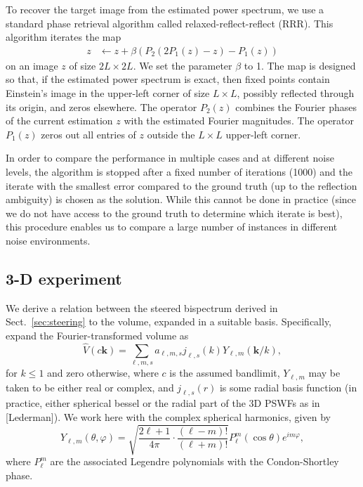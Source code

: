 \documentclass[english,11pt]{article}
\newcommand{\1}{\mathbf{1}}
\newcommand{\kk}{\textbf{k}}
\newcommand{\TODO}[1]{{\color{red}{[#1]}}}
\numberwithin{equation}{section}
\theoremstyle{plain}
\theoremstyle{definition}
\theoremstyle{remark}
\theoremstyle{plain}
\theoremstyle{remark}
\theoremstyle{plain}
\theoremstyle{plain}
\begin{document}
To recover the target image from the estimated power spectrum, we use a standard phase retrieval algorithm called relaxed-reflect-reflect (RRR). This algorithm iterates the map
\begin{align*}
	z & \leftarrow z + \beta (P_2(2P_1(z) - z) - P_1(z))
\end{align*}
on an image $z$ of size $2L\times 2L$.
We set the parameter $\beta$ to 1.
The map is designed so that, if the estimated power spectrum is exact, then fixed points contain Einstein's image in the upper-left corner of size $L \times L$, possibly reflected through its origin, and zeros elsewhere. The operator $P_2(z)$ combines the Fourier phases of  the current estimation $z$ with the estimated Fourier magnitudes. The operator $P_1(z)$ zeros out all entries of $z$ outside the $L\times L$ upper-left corner. 

In order to compare the performance in multiple cases and at different noise levels, the algorithm is stopped after a fixed number of iterations (1000) and the iterate with the smallest error compared to the ground truth (up to the reflection ambiguity) is chosen as the solution. While this cannot be done in practice (since we do not have access to the ground truth to determine which iterate is best), this procedure enables us to compare a large number of instances in different noise environments. \TODO{Note the last two sentences!}


\subsection{3-D experiment}


We derive a relation between the steered bispectrum derived in Sect.~\ref{sec:steering} to the volume, expanded in a suitable basis. Specifically, expand the Fourier-transformed volume as
\[ \widehat V(c\kk) = \sum_{\ell,m,s}a_{\ell,m,s}j_{\ell,s}(k)Y_{\ell,m}(\kk/k),\]
for $k\leq 1$ and zero otherwise, where $c$ is the assumed bandlimit, $Y_{\ell,m}$ may be taken to be either real or complex, and $j_{\ell,s}(r)$ is some radial basis function (in practice, either spherical bessel or the radial part of the 3D PSWFs as in [Lederman]). We work here with the complex spherical harmonics, given by
\[ Y_{\ell,m}(\theta,\varphi) = \sqrt{\frac{2\ell+1}{4\pi}\cdot\frac{(\ell-m)!}{(\ell+m)!}}P_{\ell}^m(\cos\theta)e^{i m\varphi},\]
where $P_{\ell}^m$ are the associated Legendre polynomials with the Condon-Shortley phase. 

\TODO{To write down the definition of the $j$ --- the spherical bessel (to copy from the ISBI)}
\end{document}

